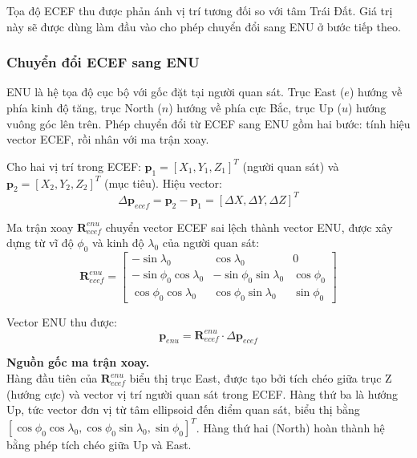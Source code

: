 Tọa độ ECEF thu được phản ánh vị trí tương đối so với tâm Trái Đất. Giá trị này sẽ được dùng làm đầu vào cho phép chuyển đổi sang ENU ở bước tiếp theo.

\subsubsection{Chuyển đổi ECEF sang ENU}

\hspace{0.5cm} ENU là hệ tọa độ cục bộ với gốc đặt tại người quan sát. Trục East ($e$) hướng về phía kinh độ tăng, trục North ($n$) hướng về phía cực Bắc, trục Up ($u$) hướng vuông góc lên trên. Phép chuyển đổi từ ECEF sang ENU gồm hai bước: tính hiệu vector ECEF, rồi nhân với ma trận xoay.

Cho hai vị trí trong ECEF: $\mathbf{p}_1 = [X_1, Y_1, Z_1]^T$ (người quan sát) và $\mathbf{p}_2 = [X_2, Y_2, Z_2]^T$ (mục tiêu). Hiệu vector:
\begin{equation}
    \Delta\mathbf{p}_{ecef} = \mathbf{p}_2 - \mathbf{p}_1 = [\Delta X, \Delta Y, \Delta Z]^T
\end{equation}

Ma trận xoay $\mathbf{R}_{ecef}^{enu}$ chuyển vector ECEF sai lệch thành vector ENU, được xây dựng từ vĩ độ $\phi_0$ và kinh độ $\lambda_0$ của người quan sát:
\begin{equation}
    \mathbf{R}_{ecef}^{enu} = \begin{bmatrix}
        -\sin\lambda_0 & \cos\lambda_0 & 0 \\
        -\sin\phi_0\cos\lambda_0 & -\sin\phi_0\sin\lambda_0 & \cos\phi_0 \\
        \cos\phi_0\cos\lambda_0 & \cos\phi_0\sin\lambda_0 & \sin\phi_0
    \end{bmatrix}
\end{equation}

Vector ENU thu được:
\begin{equation}
    \mathbf{p}_{enu} = \mathbf{R}_{ecef}^{enu} \cdot \Delta\mathbf{p}_{ecef}
\end{equation}

\textbf{Nguồn gốc ma trận xoay.\\} Hàng đầu tiên của $\mathbf{R}_{ecef}^{enu}$ biểu thị trục East, được tạo bởi tích chéo giữa trục Z (hướng cực) và vector vị trí người quan sát trong ECEF. Hàng thứ ba là hướng Up, tức vector đơn vị từ tâm ellipsoid đến điểm quan sát, biểu thị bằng $[\cos\phi_0\cos\lambda_0, \cos\phi_0\sin\lambda_0, \sin\phi_0]^T$. Hàng thứ hai (North) hoàn thành hệ bằng phép tích chéo giữa Up và East.

